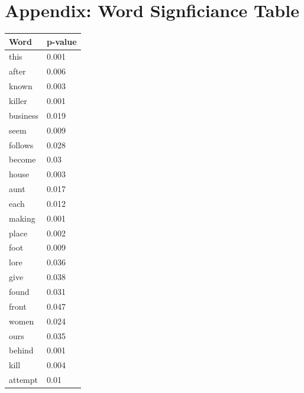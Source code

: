 \documentclass[12pt, oneside]{article}   	%
\begin{document}
\newpage



\newpage

\appendix
\section{Appendix: Word Signficiance Table}
\label{appendix:word_signif_table}

\begin{table}[H]
\begin{tabular}[t]{l|l}
\textbf{Word}        & \textbf{p-value} \\ \hline
this        & 0.001    \\
after       & 0.006    \\
known       & 0.003    \\
killer      & 0.001    \\
business    & 0.019    \\
seem        & 0.009    \\
follows     & 0.028    \\
become      & 0.03     \\
house       & 0.003    \\
aunt        & 0.017    \\
each        & 0.012    \\
making      & 0.001    \\
place       & 0.002    \\
foot        & 0.009    \\
lore        & 0.036    \\
give        & 0.038    \\
found       & 0.031    \\
front       & 0.047    \\
women       & 0.024    \\
ours        & 0.035    \\
behind      & 0.001    \\
kill        & 0.004    \\
attempt     & 0.01     \\

\end{tabular}
\end{table}
\end{document}
